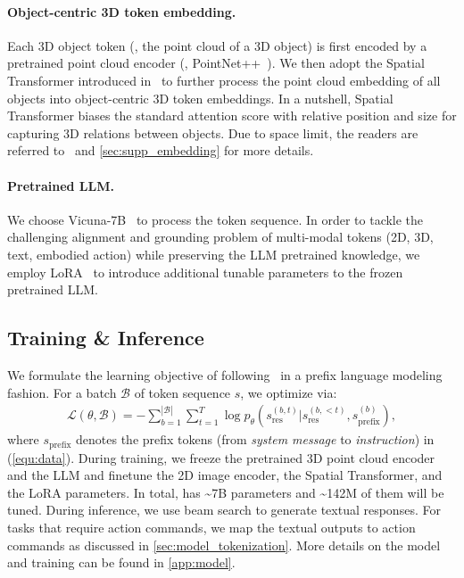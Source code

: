 \documentclass{article}
\begin{document}
\paragraph{Object-centric 3D token embedding.} Each 3D object token (\ie, the point cloud of a 3D object) is first encoded by a pretrained point cloud encoder (\eg, PointNet++~\citep{qi2017pointnet++}). We then adopt the Spatial Transformer introduced in~\cite{chen2022language} to further process the point cloud embedding of all objects into object-centric 3D token embeddings. 
In a nutshell, Spatial Transformer biases the standard attention score with relative position and size for capturing 3D relations between objects. 
Due to space limit, the readers are referred to~\cite{chen2022language} and \cref{sec:supp_embedding} for more details. %

\paragraph{Pretrained LLM.} We choose Vicuna-7B~\citep{vicuna2023}
to process the token sequence. In order to tackle the challenging alignment and grounding problem of multi-modal tokens (2D, 3D, text, embodied action) while preserving the LLM pretrained knowledge, we employ LoRA~\citep{hu2022lora} to introduce additional tunable parameters to the frozen pretrained LLM. 

\subsection{Training \& Inference}
We formulate the learning objective of \agent following~\citep{brown2020language,raffel2020exploring} in a prefix language modeling fashion. For a batch $\mathcal{B}$ of token sequence $s$, we optimize \agent via:
\vskip -0.3in
\begin{align}
   \mathcal{L}(\theta, \mathcal{B}) = -\sum^{|\mathcal{B}|}_{b=1}\sum^{T}_{t=1}\log p_{\theta}(s_{\text{res}}^{(b,t)}|s_{\text{res}}^{(b,<t)},s_{\text{prefix}}^{(b)}), 
\end{align}
\vskip -0.15in
where $s_\text{prefix}$ denotes the prefix tokens (from \textit{system message} to \textit{instruction}) in (\ref{equ:data}). 
During training, we freeze the pretrained 3D point cloud encoder and the LLM and finetune the 2D image encoder, the Spatial Transformer, and the LoRA parameters.
In total, \agent has \textasciitilde{}7B parameters and \textasciitilde{}142M of them will be tuned. 
During inference, we use beam search to generate textual responses. For tasks that require action commands, we map the textual outputs to action commands as discussed in \cref{sec:model_tokenization}. More details on the model and training can be found in \cref{app:model}.
\end{document}
